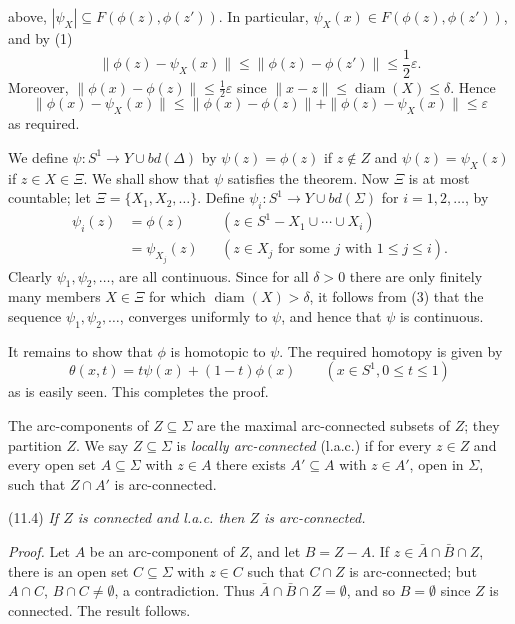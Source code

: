 \noindent above, $|\psi_X| \subseteq F(\phi(z), \phi(z'))$. In particular, $\psi_X(x) \in F(\phi(z), \phi(z'))$, and by (1)
\begin{equation*}
\|\phi(z) - \psi_X(x)\| \le \|\phi(z) - \phi(z')\| \le \frac{1}{2}\varepsilon.
\end{equation*}
Moreover, $\|\phi(x) - \phi(z)\| \le \frac{1}{2}\varepsilon$ since $\|x - z\| \le \operatorname{diam}(X) \le \delta$. Hence
\begin{equation*}
\|\phi(x) - \psi_X(x)\| \le \|\phi(x) - \phi(z)\| + \|\phi(z) - \psi_X(x)\| \le \varepsilon
\end{equation*}
as required.

We define $\psi \colon S^1 \to Y \cup bd(\Delta)$ by $\psi(z) = \phi(z)$ if $z \notin Z$ and $\psi(z) = \psi_X(z)$ if $z \in X \in \Xi$. We shall show that $\psi$ satisfies the theorem. Now $\Xi$ is at most countable; let $\Xi = \{X_1, X_2, \dots\}$. Define $\psi_i \colon S^1 \to Y \cup bd(\Sigma)$ for $i = 1, 2, \dots$, by
\begin{align*}
\psi_i(z) &= \phi(z) && (z \in S^1 - X_1 \cup \cdots \cup X_i) \\
&= \psi_{X_j}(z) && (z \in X_j \text{ for some } j \text{ with } 1 \le j \le i).
\end{align*}
Clearly $\psi_1, \psi_2, \dots$, are all continuous. Since for all $\delta > 0$ there are only finitely many members $X \in \Xi$ for which $\operatorname{diam}(X) > \delta$, it follows from (3) that the sequence $\psi_1, \psi_2, \dots$, converges uniformly to $\psi$, and hence that $\psi$ is continuous.

It remains to show that $\phi$ is homotopic to $\psi$. The required homotopy is given by
\begin{equation*}
\theta(x, t) = t\psi(x) + (1 - t)\phi(x) \qquad (x \in S^1, 0 \le t \le 1)
\end{equation*}
as is easily seen. This completes the proof.

The arc-components of $Z \subseteq \Sigma$ are the maximal arc-connected subsets of $Z$; they partition $Z$. We say $Z \subseteq \Sigma$ is \textit{locally arc-connected} (l.a.c.) if for every $z \in Z$ and every open set $A \subseteq \Sigma$ with $z \in A$ there exists $A' \subseteq A$ with $z \in A'$, open in $\Sigma$, such that $Z \cap A'$ is arc-connected.

\stmt
(11.4) \textit{If $Z$ is connected and l.a.c. then $Z$ is arc-connected.}

\textit{Proof.} Let $A$ be an arc-component of $Z$, and let $B = Z - A$. If $z \in \bar{A} \cap \bar{B} \cap Z$, there is an open set $C \subseteq \Sigma$ with $z \in C$ such that $C \cap Z$ is arc-connected; but $A \cap C$, $B \cap C \ne \emptyset$, a contradiction. Thus $\bar{A} \cap \bar{B} \cap Z = \emptyset$, and so $B = \emptyset$ since $Z$ is connected. The result follows.

